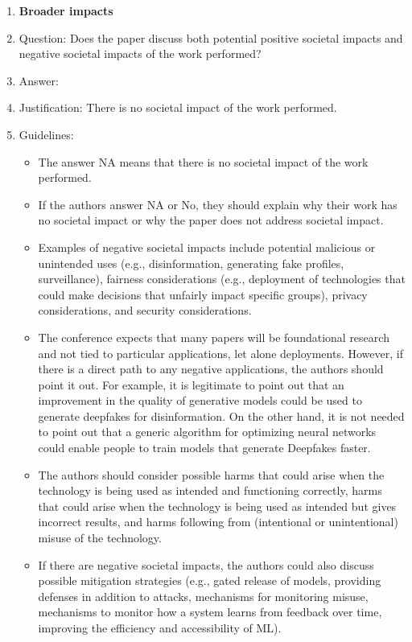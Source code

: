 \documentclass{article}
\theoremstyle{plain}
\theoremstyle{definition}
\theoremstyle{remark}
\begin{document}
\begin{enumerate}
\item {\bf Broader impacts}
    \item[] Question: Does the paper discuss both potential positive societal impacts and negative societal impacts of the work performed?
    \item[] Answer: \answerNA{} %
    \item[] Justification: There is no societal impact of the work performed.
    \item[] Guidelines:
    \begin{itemize}
        \item The answer NA means that there is no societal impact of the work performed.
        \item If the authors answer NA or No, they should explain why their work has no societal impact or why the paper does not address societal impact.
        \item Examples of negative societal impacts include potential malicious or unintended uses (e.g., disinformation, generating fake profiles, surveillance), fairness considerations (e.g., deployment of technologies that could make decisions that unfairly impact specific groups), privacy considerations, and security considerations.
        \item The conference expects that many papers will be foundational research and not tied to particular applications, let alone deployments. However, if there is a direct path to any negative applications, the authors should point it out. For example, it is legitimate to point out that an improvement in the quality of generative models could be used to generate deepfakes for disinformation. On the other hand, it is not needed to point out that a generic algorithm for optimizing neural networks could enable people to train models that generate Deepfakes faster.
        \item The authors should consider possible harms that could arise when the technology is being used as intended and functioning correctly, harms that could arise when the technology is being used as intended but gives incorrect results, and harms following from (intentional or unintentional) misuse of the technology.
        \item If there are negative societal impacts, the authors could also discuss possible mitigation strategies (e.g., gated release of models, providing defenses in addition to attacks, mechanisms for monitoring misuse, mechanisms to monitor how a system learns from feedback over time, improving the efficiency and accessibility of ML).
    \end{itemize}
    

\end{enumerate}
\end{document}
